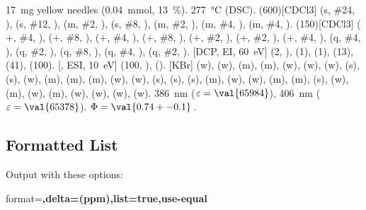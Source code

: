 \documentclass{chemmacros-manual}
\begin{document}
\begin{experimental}[delta=(ppm),pos-number=sub,use-equal]
   \qty{17}{\milli\gram} yellow needles (\qty{0.04}{\milli\mole},
  \qty{13}{\percent}).
   \qty{277}{\celsius} (DSC).
  \NMR(600)[CDCl3]  (s, \#{24}, ),  (s, \#{12},
  ),  (m, \#{2}, ),  (s, \#{8},
  ),  (m, \#{2}, ),  (m, \#{4},
  ),  (m, \#{4}, ).
  (150)[CDCl3]  ($+$, \#{4}, ),  ($+$,
  \#{8}, ),  ($+$, \#{4}, ),  ($+$, \#{8},
  ),  ($+$, \#{2}, ),  ($+$, \#{2},
  ),  ($+$, \#{4}, ),  (q, \#{4},
  ),  (q, \#{2}, ),  (q, \#{8}, ),
   (q, \#{4}, ),  (q, \#{2}, ).
  [DCP, EI, \qty{60}{\electronvolt}]  (2, ), 
  (1),  (1),  (13),  (41),  (100).
  [, ESI, \qty{10}{\electronvolt}]  (100,
  ),  ().
  [KBr]  (w),  (w),  (m), 
  (m),  (w),  (w),  (w),  (s),
   (s),  (w),  (m),  (m), 
  (m),  (w),  (w),  (s),  (s),
   (s),  (m),  (w),  (w), 
  (m),  (m),  (s),  (w),  (m), 
  (w),  (m),  (w),  (w),  (w), 
  (w).
   \qty{386}{\nano\metre} ($\varepsilon = \val{65984}$),
  \qty{406}{\nano\metre} ($\varepsilon = \val{65378}$).
   $\Phi = \val{0.74+-0.1}$\,.
\end{experimental}

\subsection{Formatted List}
Output with these options:

\begin{sourcecode}
  format=\bfseries,delta=(ppm),list=true,use-equal
\end{sourcecode}
\end{document}
